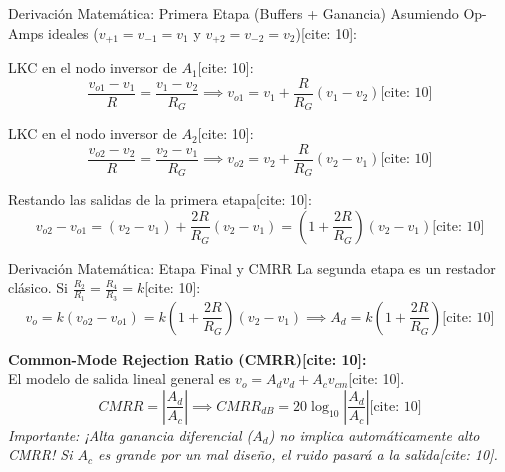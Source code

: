 \documentclass[aspectratio=169]{beamer}
\begin{document}
\begin{frame}{Derivación Matemática: Primera Etapa (Buffers + Ganancia)}
    Asumiendo Op-Amps ideales ($v_{+1} = v_{-1} = v_1$ y $v_{+2} = v_{-2} = v_2$)[cite: 10]:
    
    LKC en el nodo inversor de $A_1$[cite: 10]:
    \begin{equation*}
        \frac{v_{o1} - v_1}{R} = \frac{v_1 - v_2}{R_G} \implies v_{o1} = v_1 + \frac{R}{R_G}(v_1 - v_2) \text{[cite: 10]}
    \end{equation*}
    
    LKC en el nodo inversor de $A_2$[cite: 10]:
    \begin{equation*}
        \frac{v_{o2} - v_2}{R} = \frac{v_2 - v_1}{R_G} \implies v_{o2} = v_2 + \frac{R}{R_G}(v_2 - v_1) \text{[cite: 10]}
    \end{equation*}
    
    Restando las salidas de la primera etapa[cite: 10]:
    \begin{equation*}
        v_{o2} - v_{o1} = (v_2 - v_1) + \frac{2R}{R_G}(v_2 - v_1) = \boxed{ \left(1 + \frac{2R}{R_G}\right)(v_2 - v_1) } \text{[cite: 10]}
    \end{equation*}
\end{frame}

\begin{frame}{Derivación Matemática: Etapa Final y CMRR}
    La segunda etapa es un restador clásico. Si $\frac{R_2}{R_1} = \frac{R_4}{R_3} = k$[cite: 10]:
    \begin{equation*}
        v_o = k(v_{o2} - v_{o1}) = k \left(1 + \frac{2R}{R_G}\right)(v_2 - v_1) \implies \boxed{A_d = k \left(1 + \frac{2R}{R_G}\right)} \text{[cite: 10]}
    \end{equation*}
    
    \textbf{Common-Mode Rejection Ratio (CMRR)[cite: 10]:} \\
    El modelo de salida lineal general es $v_o = A_d v_d + A_c v_{cm}$[cite: 10].
    \begin{equation*}
        CMRR = \left| \frac{A_d}{A_c} \right| \implies \boxed{ CMRR_{dB} = 20\log_{10} \left| \frac{A_d}{A_c} \right| } \text{[cite: 10]}
    \end{equation*}
    \textit{Importante: ¡Alta ganancia diferencial ($A_d$) no implica automáticamente alto CMRR! Si $A_c$ es grande por un mal diseño, el ruido pasará a la salida[cite: 10].}
\end{frame}
\end{document}
